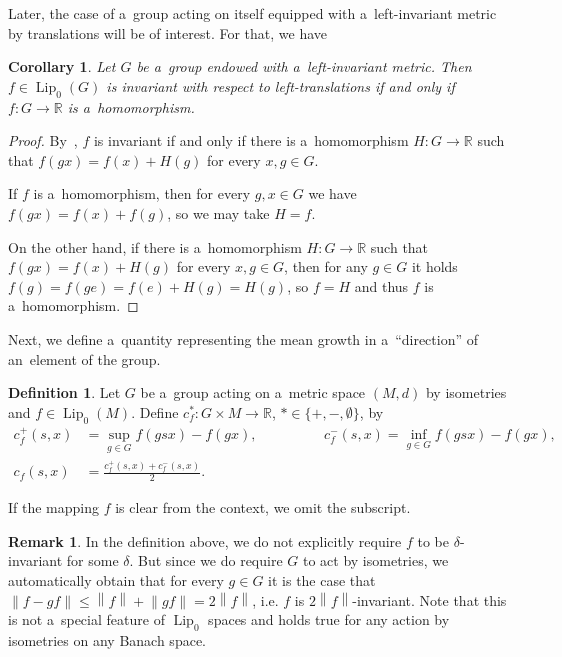 \documentclass[11pt,a4paper]{amsart}
\newtheorem{corollary}[theorem]{Corollary}
\theoremstyle{definition}
\newtheorem{definition}[theorem]{Definition}
\newtheorem{remark}[theorem]{Remark}
\newcommand{\R}{\mathbb{R}}
\newcommand{\norm}[1]{\left\| #1 \right\|}
\newcommand{\Lipz}{\operatorname{Lip}_0}
\begin{document}
	Later, the case of a~group acting on itself equipped with a~left-invariant metric by translations will be of interest. For that, we have
	
	\begin{corollary} \label{cor:InvForLeftTranslation}
		Let $G$ be a~group endowed with a~left-invariant metric. Then $f \in \Lipz(G)$ is invariant with respect to left-translations if and only if $f: G \to \R$ is a~homomorphism.
	\end{corollary}
	\begin{proof}
		By~, $f$ is invariant if and only if there is a~homomorphism $H: G \to \R$ such that $f(gx) = f(x) + H(g)$ for every $x,g \in G$.
		
		If $f$ is a~homomorphism, then for every $g,x \in G$ we have $f(gx) = f(x) + f(g)$, so we may take $H = f$.
		
		On the other hand, if there is a~homomorphism $H: G \to \R$ such that $f(gx) = f(x) + H(g)$ for every $x,g \in G$, then for any $g \in G$ it holds $f(g) = f(ge) = f(e) + H(g) = H(g)$, so $f = H$ and thus $f$ is a~homomorphism.
	\end{proof}
	
	Next, we define a~quantity representing the mean growth in a~``direction'' of an~element of the group.
	
	\begin{definition}
		Let $G$ be a~group acting on a~metric space $(M, d)$ by isometries and $f \in \Lipz(M)$. Define $c^*_f: G \times M \to \R$, $* \in \{+, -, \emptyset\}$, by
		\begin{align*}
			c^+_f(s, x) &= \sup\limits_{g \in G} f(gsx) - f(gx), \hspace{2cm}
			c^-_f(s, x) = \inf\limits_{g \in G} f(gsx) - f(gx), \\
			c_f(s, x) &= \frac{c^+_f(s,x) + c^-_f(s, x)}{2}.
		\end{align*}
	\end{definition}
	
	If the mapping $f$ is clear from the context, we omit the subscript.
	
	\begin{remark} \label{rem:everythingIsDeltaInv}
		In the definition above, we do not explicitly require $f$ to be $\delta$-invariant for some $\delta$. But since we do require $G$ to act by isometries, we automatically obtain that for every $g \in G$ it is the case that $\norm{f - gf} \leq \norm{f} + \norm{gf} = 2\norm{f}$, i.e. $f$ is $2\norm{f}$-invariant. Note that this is not a~special feature of $\Lipz$ spaces and holds true for any action by isometries on any Banach space.
	\end{remark}
	
\end{document}
